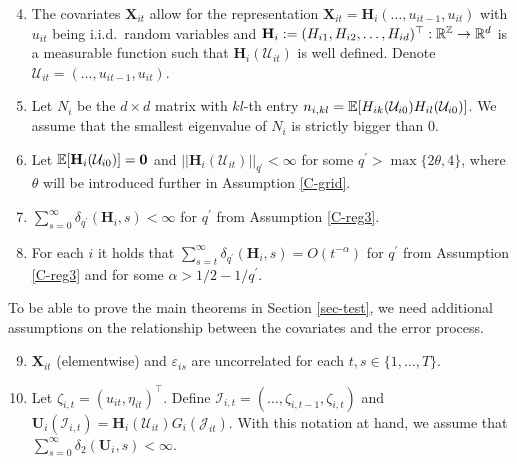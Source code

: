 \documentclass[a4paper,12pt]{article}
\begin{document}
\begin{enumerate}[label=(C\arabic*),leftmargin=1.05cm]
\setcounter{enumi}{3}

\item \label{C-reg1} The covariates $ \mathbf{X}_{it}$ allow for the representation $ \mathbf{X}_{it} = \mathbf{H}_i(\ldots,u_{it-1},u_{it})$ with $u_{it}$ being i.i.d.\ random variables and $\mathbf{H}_i := (H_{i1}, H_{i2}, \ldots, H_{id})^\top: \mathbb{R}^{\mathbb{Z}} \rightarrow \mathbb{R}^d$ is a measurable function such that $\mathbf{H}_i(\mathcal{U}_{it})$ is well defined. Denote $\mathcal{U}_{it} = (\ldots, u_{it-1}, u_{it})$.

\item \label{C-reg2} Let $N_i$ be the $d\times d$ matrix with $kl$-th entry $n_{i, kl}= \mathbb{E}[H_{ik}(\mathcal{U}_{i0})H_{il}(\mathcal{U}_{i0})]$. We assume that the smallest eigenvalue of $N_i$ is strictly bigger than $0$.

\item \label{C-reg3} Let $\mathbb{E} [\mathbf{H}_{i}(\mathcal{U}_{i0})]=\mathbf{0}$ and $||\mathbf{H}_{i}(\mathcal{U}_{it})||_{q^\prime} <\infty$ for some $q^\prime > \max\{ 2\theta, 4\}$, where $\theta$ will be introduced further in Assumption \ref{C-grid}.
\item \label{C-reg4} $\sum_{s=0}^\infty \delta_{q^\prime}(\mathbf{H}_i, s)<\infty$ for $q^\prime$ from Assumption \ref{C-reg3}.
\item \label{C-reg5} For each $i$ it holds that $\sum_{s=t}^{\infty} \delta_{q^\prime}(\mathbf{H}_{i}, s)= O(t^{-\alpha}) $ for $q^\prime$ from Assumption \ref{C-reg3} and for some $\alpha > 1/2 - 1/{q^\prime}$.
\end{enumerate}

To be able to prove the main theorems in Section \ref{sec-test}, we need additional assumptions on the relationship between the covariates and the error process.

\begin{enumerate}[label=(C\arabic*),leftmargin=1.05cm]
\setcounter{enumi}{8}
\item \label{C-reg-err1} $\mathbf{X}_{it}$ (elementwise) and $\varepsilon_{is}$ are uncorrelated for each $t, s\in \{1, \ldots, T\}$.
\item \label{C-reg-err2} Let $\zeta_{i, t} = (u_{it}, \eta_{it})^\top$. Define $\mathcal{I}_{i, t} = (\ldots, \zeta_{i, t-1}, \zeta_{i, t})$ and $\mathbf{U}_i(\mathcal{I}_{i, t}) =  \mathbf{H}_i(\mathcal{U}_{it})G_i(\mathcal{J}_{it})$. With this notation at hand, we assume that $\sum_{s=0}^\infty \delta_2(\mathbf{U}_i, s)<\infty$.

\end{enumerate}
\end{document}
